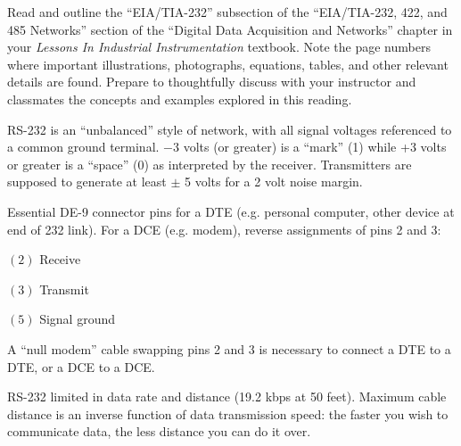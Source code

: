 

Read and outline the ``EIA/TIA-232'' subsection of the ``EIA/TIA-232, 422, and 485 Networks'' section of the ``Digital Data Acquisition and Networks'' chapter in your {\it Lessons In Industrial Instrumentation} textbook.  Note the page numbers where important illustrations, photographs, equations, tables, and other relevant details are found.  Prepare to thoughtfully discuss with your instructor and classmates the concepts and examples explored in this reading.














RS-232 is an ``unbalanced'' style of network, with all signal voltages referenced to a common ground terminal.  $-3$ volts (or greater) is a ``mark'' (1) while +3 volts or greater is a ``space'' (0) as interpreted by the receiver.  Transmitters are supposed to generate at least $\pm$ 5 volts for a 2 volt noise margin.

\vskip 10pt

Essential DE-9 connector pins for a DTE (e.g. personal computer, other device at end of 232 link).  For a DCE (e.g. modem), reverse assignments of pins 2 and 3:

\item{$(2)$} Receive
\item{$(3)$} Transmit
\item{$(5)$} Signal ground

\vskip 10pt

A ``null modem'' cable swapping pins 2 and 3 is necessary to connect a DTE to a DTE, or a DCE to a DCE.

\vskip 10pt

RS-232 limited in data rate and distance (19.2 kbps at 50 feet).  Maximum cable distance is an inverse function of data transmission speed: the faster you wish to communicate data, the less distance you can do it over.









